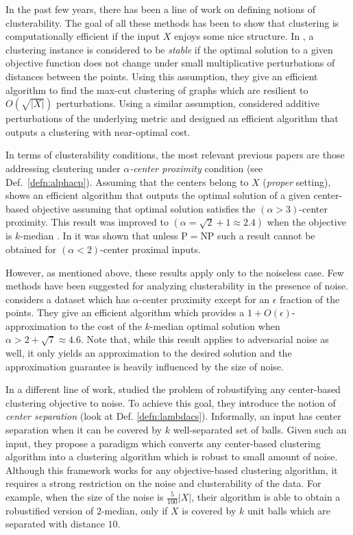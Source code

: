 \documentclass[12pt]{article}
\begin{document}
In the past few years, there has been a line of work on defining notions of clusterability. The goal of all these methods has been to show that clustering is computationally efficient if the input $X$ enjoys some nice structure. In \cite{bilu2012stable}, a clustering instance is considered to be \emph{stable} if the optimal solution to a given objective function does not change under small multiplicative perturbations of distances between the points. Using this assumption, they give an efficient algorithm to find the max-cut clustering of graphs which are resilient to $O(\sqrt{|X|})$ perturbations. Using a similar assumption, \cite{ackerman2009clusterability} considered additive perturbations of the underlying metric and designed an efficient algorithm that outputs a clustering with near-optimal cost. 

In terms of clusterability conditions, the most relevant previous papers are those addressing clsutering under {\em $\alpha$-center proximity} condition (see Def.~\ref{defn:alphacp}).
Assuming that the centers belong to $X$ ({\em proper} setting),  \cite{awasthi2012center} shows an efficient algorithm that outputs the optimal solution of a given center-based objective assuming that optimal solution satisfies the $(\alpha > 3)$-center proximity. This result was improved to $(\alpha = \sqrt{2} + 1 \approx 2.4)$ when the objective is $k$-median \cite{balcan2012clustering}. In \cite{ben2014data} it was shown that unless P$=$NP such a result cannot be obtained for $(\alpha <2)$-center proximal inputs.

However, as mentioned above, these results apply only to the noiseless case.
Few methods have been suggested for analyzing clusterability in the presence of noise. 
\cite{balcan2012clustering} considers a dataset which has $\alpha$-center proximity except for an $\epsilon$ fraction of the points. They give an efficient algorithm which provides a $1+O(\epsilon)$-approximation to the cost of the $k$-median optimal solution when $\alpha > 2+\sqrt{7} \approx 4.6$. Note that, while this result applies to adversarial noise as well, it only yields an approximation to the desired solution and  the approximation guarantee is heavily influenced by the size of noise. 

In a different line of work, \cite{ben2014clustering} studied the problem of robustifying any center-based clustering objective to noise. To achieve this goal, they introduce the notion of {\em center separation} (look at Def. \ref{defn:lambdacs}). Informally, an input has center separation when it can be covered by $k$ well-separated set of balls.
Given such an input, they propose a paradigm which converts any center-based clustering algorithm into a clustering algorithm which is robust to small amount of noise.
Although this framework works for any objective-based clustering algorithm, it requires a strong restriction on the noise and clusterability of the data. For example, when the size of the noise is $\frac{5}{100}|X|$, their algorithm is able to obtain a robustified version of $2$-median, only if $X$ is covered by $k$ unit balls which are separated with distance $10$. 
\end{document}
